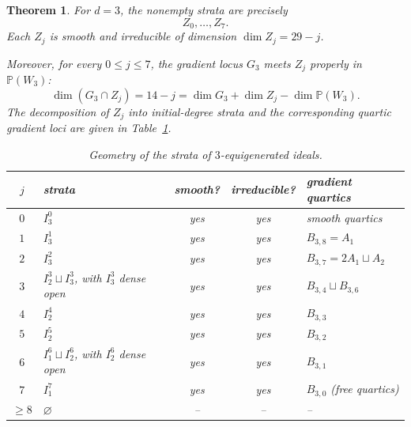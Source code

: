 \documentclass[11pt]{amsart} %
\newtheorem{Theorem}{Theorem}[section]
\theoremstyle{definition}
\def\NZQ{\mathbb}               %
\def\PP{{\NZQ P}}
\begin{document}
\begin{Theorem}\label{thm:strata-d-3}
For $d=3$, the nonempty strata are precisely
\[
Z_0,\ldots,Z_7.
\]
Each $Z_j$ is smooth and irreducible of dimension \(\dim Z_j=29-j\).

Moreover, for every $0\leq j\leq7$, the gradient locus $G_3$ meets
$Z_j$ properly in $\PP(W_3)$:
\[
\dim(G_3\cap Z_j)
=
14-j
=
\dim G_3+\dim Z_j-\dim\PP(W_3).
\]
The decomposition of $Z_j$ into initial-degree strata and the
corresponding quartic gradient loci are given in
Table~\ref{table:geom-strata-d-3}.
\begin{table}[ht]
\caption{Geometry of the strata of $3$-equigenerated ideals.}
\label{table:geom-strata-d-3}
\centering
\begin{tabular}{|c|l|c|c|l|}
\hline
$j$ & strata & smooth? & irreducible? & gradient quartics\\
\hline
$0$ & $I_3^0$
    & yes & yes & smooth quartics\\
\hline
$1$ & $I_3^1$
    & yes & yes & $B_{3,8}=A_1$\\
\hline
$2$ & $I_3^2$
    & yes & yes & $B_{3,7}=2A_1\sqcup A_2$\\
\hline
$3$ & $I_2^3\sqcup I_3^3$, with $I_3^3$ dense open
    & yes & yes & $B_{3,4}\sqcup B_{3,6}$\\
\hline
$4$ & $I_2^4$
    & yes & yes & $B_{3,3}$\\
\hline
$5$ & $I_2^5$
    & yes & yes & $B_{3,2}$\\
\hline
$6$ & $I_1^6\sqcup I_2^6$, with $I_2^6$ dense open
    & yes & yes & $B_{3,1}$\\
\hline
$7$ & $I_1^7$
    & yes & yes & $B_{3,0}$ (free quartics)\\
\hline
$\geq8$ & $\varnothing$
    & -- & -- & --\\
\hline
\end{tabular}
\end{table}
\end{Theorem}
\end{document}
